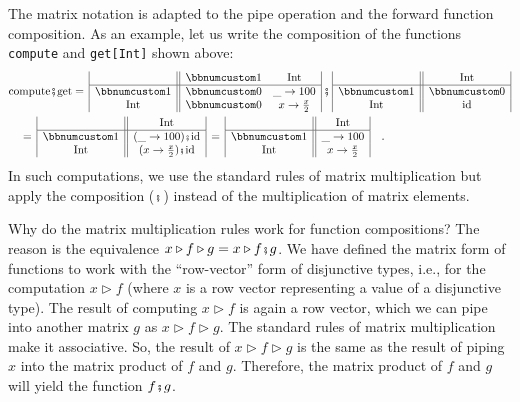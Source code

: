The matrix notation is adapted to the pipe operation and the forward
function composition. As an example, let us write the composition
of the functions \lstinline!compute! and \lstinline!get[Int]! shown
above: 
\begin{align*}
 & \text{compute}\bef\text{get}=\,\begin{array}{|c||cc|}
 & \bbnum 1 & \text{Int}\\
\hline \bbnum 1 & \bbnum 0 & \_\rightarrow100\\
\text{Int} & \bbnum 0 & x\rightarrow\frac{x}{2}
\end{array}\,\bef\,\begin{array}{|c||c|}
 & \text{Int}\\
\hline \bbnum 1 & \bbnum 0\\
\text{Int} & \text{id}
\end{array}\\
 & \quad=\,\begin{array}{|c||c|}
 & \text{Int}\\
\hline \bbnum 1 & (\_\rightarrow100)\bef\text{id}\\
\text{Int} & (x\rightarrow\frac{x}{2})\bef\text{id}
\end{array}\,=\,\begin{array}{|c||c|}
 & \text{Int}\\
\hline \bbnum 1 & \_\rightarrow100\\
\text{Int} & x\rightarrow\frac{x}{2}
\end{array}\quad.
\end{align*}
In such computations, we use the standard rules of matrix multiplication
but apply the composition ($\bef$) instead of the multiplication
of matrix elements.

Why do the matrix multiplication rules work for function compositions?
The reason is the equivalence $x\triangleright f\triangleright g=x\triangleright f\bef g$.
We have defined the matrix form of functions to work with the \textsf{``}row-vector\textsf{''}
form of disjunctive types, i.e., for the computation $x\triangleright f$
(where $x$ is a row vector representing a value of a disjunctive
type). The result of computing $x\triangleright f$ is again a row
vector, which we can pipe into another matrix $g$ as $x\triangleright f\triangleright g$.
The standard rules of matrix multiplication make it associative. So,
the result of $x\triangleright f\triangleright g$ is the same as
the result of piping $x$ into the matrix product of $f$ and $g$.
Therefore, the matrix product of $f$ and $g$ will yield the function
$f\bef g$.

